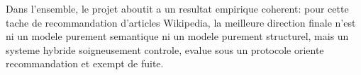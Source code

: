 Dans l'ensemble, le projet aboutit a un resultat empirique coherent: pour cette
tache de recommandation d'articles Wikipedia, la meilleure direction finale
n'est ni un modele purement semantique ni un modele purement structurel, mais
un systeme hybride soigneusement controle, evalue sous un protocole oriente
recommandation et exempt de fuite.
